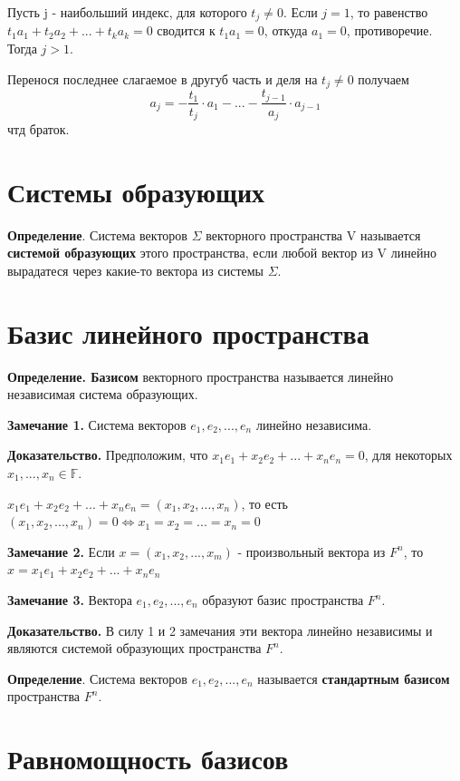 \documentclass[a4paper]{article}
\begin{document}
Пусть j - наибольший индекс, для которого $t_j \neq 0$. Если $j=1$, то равенство  $t_1a_1 + t_2a_2 + ... + t_ka_k = 0$ сводится к $t_1a_1 = 0$, откуда $a_1 = 0$, противоречие. Тогда $j>1$.

Перенося последнее слагаемое в другуб часть и деля на $t_j \neq 0$ получаем \begin{equation}
\displaystyle a_j = -\frac{t_1}{t_j}\cdot a_1 - ... - \frac{t_{j-1}}{a_j} \cdot a_{j-1}
\end{equation}
чтд браток.

\section*{Системы образующих}
\textbf{Определение}. Система векторов $\Sigma$ векторного пространства V называется \textbf{системой образующих} этого пространства, если любой вектор из V линейно вырадатеся через какие-то вектора из системы $\Sigma$.

\section*{Базис линейного пространства}
\textbf{Определение. Базисом} векторного пространства называется линейно независимая
система образующих.


\textbf{Замечание 1.} Система векторов $e_1, e_2, ..., e_n$ линейно независима.

\textbf{Доказательство.} Предположим, что $x_1e_1+x_2e_2 + ... + x_ne_n = 0$, для некоторых $x_1, ..., x_n \in \mathbb{F}$. 

$x_1e_1+x_2e_2 + ... + x_ne_n = (x_1, x_2, ..., x_n)$, то есть $(x_1, x_2, ..., x_n) = 0 \Leftrightarrow x_1 = x_2 = ... = x_n = 0$

\textbf{Замечание 2.} Если $x = (x_1, x_2, ..., x_m) $ - произвольный вектора из $F^n$, то $x = x_1e_1 + x_2e_2 + ... + x_ne_n$

\textbf{Замечание 3.} Вектора $e_1, e_2, ..., e_n$ образуют базис пространства $F^n$.

\textbf{Доказательство.} В силу 1 и 2 замечания эти вектора линейно независимы и являются системой образующих пространства $F^n$.

\textbf{Определение}. Система векторов $e_1, e_2, ..., e_n$ называется \textbf{стандартным базисом} пространства $F^n$.

\section*{Равномощность базисов}
\end{document}
